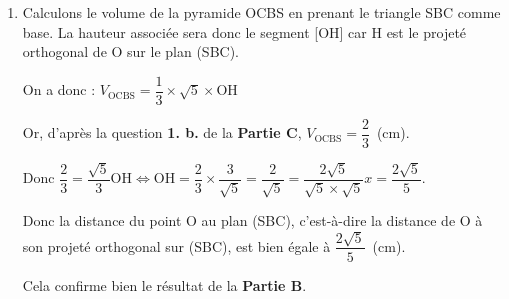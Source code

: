 \begin{enumerate}
		\item Calculons le volume de la pyramide OCBS en prenant le triangle SBC comme base. La hauteur associée sera donc le segment [OH] car H est le projeté orthogonal de O sur le plan (SBC).

On a donc : \quad $ V_{\mathrm{OCBS}} = \dfrac{1}{3} \times \sqrt{5} \times \mathrm{OH}$

Or, d'après la question \textbf{1. b.} de la \textbf{Partie C}, \quad$ V_{\mathrm{OCBS}} = \dfrac{2}{3}$~(cm).

Donc \quad $\dfrac{2}{3}= \dfrac{\sqrt{5}}{3} \mathrm{OH} \iff \mathrm{OH} = \dfrac{2}{3} \times \dfrac{3}{\sqrt{5}} = \dfrac{2}{\sqrt{5}} = \dfrac{2 \sqrt{5}}{\sqrt{5}\times \sqrt{5}}x= \dfrac{2\sqrt{5}}{5}$.

Donc la distance du point O au plan (SBC), c'est-à-dire la distance de O à son projeté orthogonal sur (SBC), est bien égale à $\dfrac{2 \sqrt{5}}{5}$~(cm).

Cela confirme bien le résultat de la \textbf{Partie B}.
	\end{enumerate}
